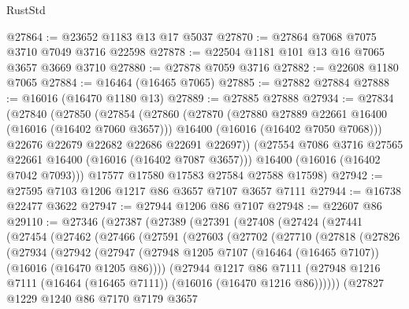 \begin{lexlean}{RustStd}
\begin{coremodule}
@27864 := @23652 @1183 @13 @17 @5037
@27870 := @27864 @7068 @7075 @3710 @7049 @3716 @22598
@27878 := @22504 @1181 @101 @13 @16 @7065 @3657 @3669 @3710
@27880 := @27878 @7059 @3716
@27882 := @22608 @1180 @7065
@27884 := @16464 (@16465 @7065)
@27885 := @27882 @27884
@27888 := @16016 (@16470 @1180 @13)
@27889 := @27885 @27888
@27934 := @27834
    (@27840
      (@27850
        (@27854
          (@27860
            (@27870
              (@27880 @27889 @22661 @16400 (@16016 (@16402 @7060 @3657)))
              @16400
              (@16016 (@16402 @7050 @7068)))
            @22676
            @22679
            @22682
            @22686
            @22691
            @22697))
        (@27554 @7086 @3716 @27565 @22661 @16400 (@16016 (@16402 @7087 @3657)))
        @16400
        (@16016 (@16402 @7042 @7093)))
      @17577
      @17580
      @17583
      @27584
      @27588
      @17598)
@27942 := @27595 @7103 @1206 @1217 @86 @3657 @7107 @3657 @7111
@27944 := @16738 @22477 @3622
@27947 := @27944 @1206 @86 @7107
@27948 := @22607 @86
@29110 := @27346
    (@27387
      (@27389
        (@27391
          (@27408
            (@27424
              (@27441
                (@27454
                  (@27462
                    (@27466
                      (@27591
                        (@27603
                          (@27702
                            (@27710
                              (@27818
                                (@27826
                                  (@27934
                                    (@27942
                                      (@27947
                                        (@27948
                                          @1205
                                          @7107
                                          (@16464 (@16465 @7107))
                                          (@16016 (@16470 @1205 @86))))
                                      (@27944
                                        @1217
                                        @86
                                        @7111
                                        (@27948
                                          @1216
                                          @7111
                                          (@16464 (@16465 @7111))
                                          (@16016 (@16470 @1216 @86))))))
                                  (@27827
                                    @1229
                                    @1240
                                    @86
                                    @7170
                                    @7179
                                    @3657

\end{coremodule}
\end{lexlean}
